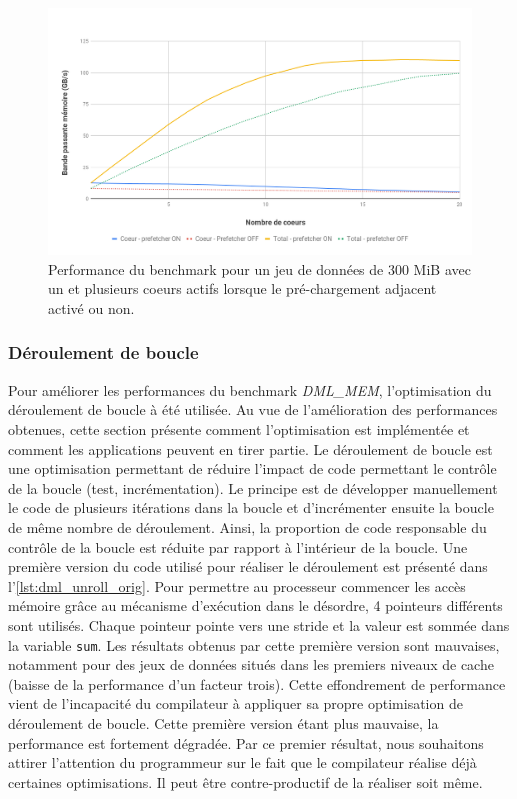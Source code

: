         
        \begin{figure}
        \center
        \includegraphics[width=14cm]{images/dml_prefetch_mpi.png}
        \caption{\label{pic:dml_prefetch_mpi} Performance du benchmark pour un jeu de données de 300 MiB avec un et plusieurs coeurs actifs lorsque le pré-chargement adjacent activé ou non.}
        \end{figure}
        
        
        
    
    \subsubsection{Déroulement de boucle} \label{sec:dml_unroll}
    Pour améliorer les performances du benchmark \textit{DML\_MEM}, l'optimisation du déroulement de boucle à été utilisée. Au vue de l'amélioration des performances obtenues, cette section présente comment l'optimisation est implémentée et comment les applications peuvent en tirer partie. 
    Le déroulement de boucle est une optimisation permettant de réduire l'impact de code permettant le contrôle de la boucle (test, incrémentation). Le principe est de développer manuellement le code de plusieurs itérations dans la boucle et d'incrémenter ensuite la boucle de même nombre de déroulement. Ainsi, la proportion de code responsable du contrôle de la boucle est réduite par rapport à l'intérieur de la boucle. Une première version du code utilisé pour réaliser le déroulement est présenté dans l'\autoref{lst:dml_unroll_orig}. Pour permettre au processeur commencer les accès mémoire grâce au mécanisme d'exécution dans le désordre, 4 pointeurs différents sont utilisés. Chaque pointeur pointe vers une stride et la valeur est sommée dans la variable \verb|sum|. Les résultats obtenus par cette première version sont mauvaises, notamment pour des jeux de données situés dans les premiers niveaux de cache (baisse de la performance d'un facteur trois). Cette effondrement de performance vient de l'incapacité du compilateur à appliquer sa propre optimisation de déroulement de boucle. Cette première version étant plus mauvaise, la performance est fortement dégradée. Par ce premier résultat, nous souhaitons attirer l'attention du programmeur sur le fait que le compilateur réalise déjà certaines optimisations. Il peut être contre-productif de la réaliser soit même. 
    
